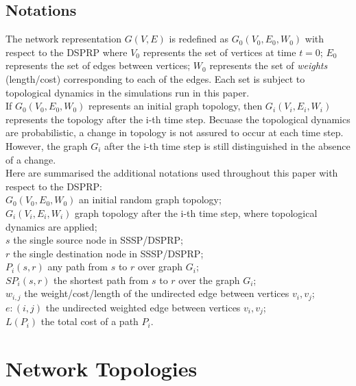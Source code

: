 \documentclass[
	a4paper, %
	10pt, %
	unnumberedsections, %
	twoside, %
]{LTJournalArticle}
\begin{document}
\subsection{Notations} 

The network representation \(G(V, E)\) is redefined as \(G_{0}(V_{0}, E_{0}, W_{0})\) with respect to the DSPRP  where \(V_{0}\) represents the set of vertices at time \(t = 0\); \(E_{0}\) represents the set of edges between vertices; \(W_{0}\) represents the set of \emph{weights} (length/cost) corresponding to each of the edges. Each set is subject to topological dynamics in the simulations run in this paper. \\


If \( G_{0}(V_{0}, E_{0}, W_{0}) \) represents an initial graph topology, then \(G_{i}(V_{i}, E_{i}, W_{i})\) represents the topology after the i-th time step. Becuase the topological dynamics are probabilistic, a change in topology is not assured to occur at each time step. However, the graph \(G_{i}\) after the i-th time step is still distinguished in the absence of a change. \\

Here are summarised the additional notations used throughout this paper with respect to the DSPRP: \\
\( G_{0}(V_{0}, E_{0}, W_{0}) \) an initial random graph topology; \\
\( G_{i}(V_{i}, E_{i}, W_{i}) \) graph topology after the i-th time step, where topological dynamics are applied; \\
\(s\) the single source node in SSSP/DSPRP; \\
\(r\) the single destination node in SSSP/DSPRP; \\
\(P_{i}(s, r)\) any path from \(s\) to \(r\) over graph \( G_{i} \); \\
\(SP_{i}(s, r)\) the shortest path from \(s\) to \(r\) over the graph \(G_{i}\); \\
\(w_{i, j}\) the weight/cost/length of the undirected edge between vertices \(v_{i}, v_{j}\); \\
\(e: (i, j) \) the undirected weighted edge between vertices \(v_{i}, v_{j}\);\\
\(L(P_{i})\) the total cost of a path \(P_{i}\). 

\section{Network Topologies} 
\end{document}
